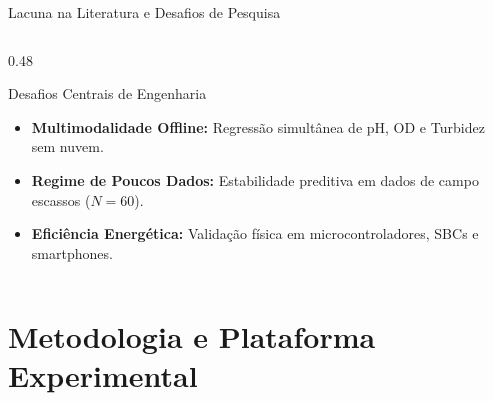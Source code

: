 \documentclass[aspectratio=169,10pt]{beamer}
\begin{document}
\begin{frame}{Lacuna na Literatura e Desafios de Pesquisa}
\begin{columns}[T,onlytextwidth]
    \begin{column}{0.48\linewidth}
      \begin{block}{Desafios Centrais de Engenharia}
        \footnotesize
        \begin{itemize}
          \item \textbf{Multimodalidade Offline:} Regressão simultânea de pH, OD e Turbidez sem nuvem.
          \item \textbf{Regime de Poucos Dados:} Estabilidade preditiva em dados de campo escassos ($N=60$).
          \item \textbf{Eficiência Energética:} Validação física em microcontroladores, SBCs e smartphones.
        \end{itemize}
      \end{block}
      \vspace{0.15cm}
      \centering
    \end{column}
  \end{columns}
\end{frame}

\section{Metodologia e Plataforma Experimental}
\end{document}
